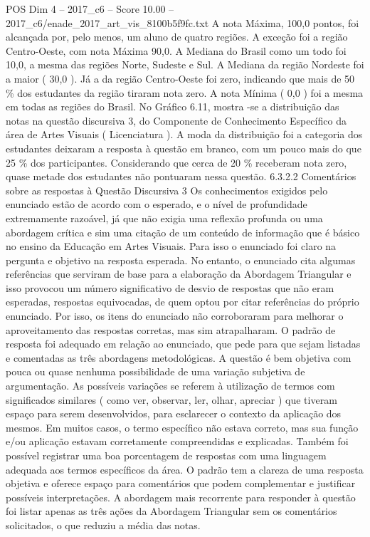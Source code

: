 \begin{textsample}{POS Dim 4 – 2017\_c6 – Score 10.00 – 2017\_c6/enade\_2017\_art\_vis\_8100b5f9fc.txt}
A nota Máxima, 100,0 pontos, foi alcançada por, pelo menos, um aluno de quatro regiões.
A exceção foi a região Centro-Oeste, com nota Máxima 90,0.
A Mediana do Brasil como um todo foi 10,0, a mesma das regiões Norte, Sudeste e Sul.
A Mediana da região Nordeste foi a maior ( 30,0 ).
Já a da região Centro-Oeste foi zero, indicando que mais de 50 \% dos estudantes da região tiraram nota zero.
A nota Mínima ( 0,0 ) foi a mesma em todas as regiões do Brasil.
No Gráfico 6.11, mostra -se a distribuição das notas na questão discursiva 3, do Componente de Conhecimento Específico da área de Artes Visuais ( Licenciatura ).
A moda da distribuição foi a categoria dos estudantes deixaram a resposta à questão em branco, com um pouco mais do que 25 \% dos participantes.
Considerando que cerca de 20 \% receberam nota zero, quase metade dos estudantes não pontuaram nessa questão. 6.3.2.2 Comentários sobre as respostas à Questão Discursiva 3 Os conhecimentos exigidos pelo enunciado estão de acordo com o esperado, e o nível de profundidade extremamente razoável, já que não exigia uma reflexão profunda ou uma abordagem crítica e sim uma citação de um conteúdo de informação que é básico no ensino da Educação em Artes Visuais.
Para isso o enunciado foi claro na pergunta e objetivo na resposta esperada.
No entanto, o enunciado cita algumas referências que serviram de base para a elaboração da Abordagem Triangular e isso provocou um número significativo de desvio de respostas que não eram esperadas, respostas equivocadas, de quem optou por citar referências do próprio enunciado.
Por isso, os itens do enunciado não corroboraram para melhorar o aproveitamento das respostas corretas, mas sim atrapalharam.
O padrão de resposta foi adequado em relação ao enunciado, que pede para que sejam listadas e comentadas as três abordagens metodológicas.
A questão é bem objetiva com pouca ou quase nenhuma possibilidade de uma variação subjetiva de argumentação.
As possíveis variações se referem à utilização de termos com significados similares ( como ver, observar, ler, olhar, apreciar ) que tiveram espaço para serem desenvolvidos, para esclarecer o contexto da aplicação dos mesmos.
Em muitos casos, o termo específico não estava correto, mas sua função e/ou aplicação estavam corretamente compreendidas e explicadas.
Também foi possível registrar uma boa porcentagem de respostas com uma linguagem adequada aos termos específicos da área.
O padrão tem a clareza de uma resposta objetiva e oferece espaço para comentários que podem complementar e justificar possíveis interpretações.
A abordagem mais recorrente para responder à questão foi listar apenas as três ações da Abordagem Triangular sem os comentários solicitados, o que reduziu a média das notas.

\end{textsample}
